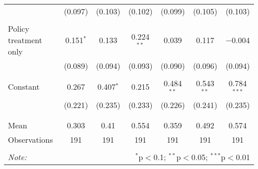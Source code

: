 \begin{tabular}{@{\extracolsep{5pt}}lcccccc}
  & (0.097) & (0.103) & (0.102) & (0.099) & (0.105) & (0.103) \\ 
  & & & & & & \\ 
 Policy treatment only & 0.151$^{*}$ & 0.133 & 0.224$^{**}$ & 0.039 & 0.117 & $-$0.004 \\ 
  & (0.089) & (0.094) & (0.093) & (0.090) & (0.096) & (0.094) \\ 
  & & & & & & \\ 
 Constant & 0.267 & 0.407$^{*}$ & 0.215 & 0.484$^{**}$ & 0.543$^{**}$ & 0.784$^{***}$ \\ 
  & (0.221) & (0.235) & (0.233) & (0.226) & (0.241) & (0.235) \\ 
  & & & & & & \\ 
\hline \\[-1.8ex] 
Mean & 0.303 & 0.41 & 0.554 & 0.359 & 0.492 & 0.574 \\ 
Observations & 191 & 191 & 191 & 191 & 191 & 191 \\ 
\hline 
\hline \\[-1.8ex] 
\textit{Note:}  & \multicolumn{6}{r}{$^{*}$p$<$0.1; $^{**}$p$<$0.05; $^{***}$p$<$0.01} \\ 
\end{tabular} 
